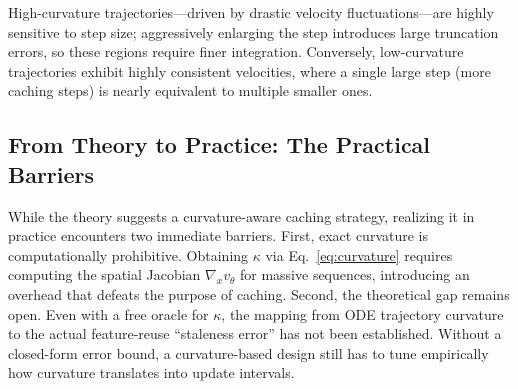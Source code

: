 High-curvature trajectories---driven by drastic velocity fluctuations---are highly sensitive to step size; aggressively enlarging the step introduces large truncation errors, so these regions require finer integration. Conversely, low-curvature trajectories exhibit highly consistent velocities, where a single large step (more caching steps) is nearly equivalent to multiple smaller ones.

\subsection{From Theory to Practice: The Practical Barriers}
While the theory suggests a curvature-aware caching strategy, realizing it in practice encounters two immediate barriers. First, exact curvature is computationally prohibitive. Obtaining $\kappa$ via Eq.~\ref{eq:curvature} requires computing the spatial Jacobian $\nabla_x v_\theta$ for massive sequences, introducing an overhead that defeats the purpose of caching. Second, the theoretical gap remains open. Even with a free oracle for $\kappa$, the mapping from ODE trajectory curvature to the actual feature-reuse ``staleness error'' has not been established. Without a closed-form error bound, a curvature-based design still has to tune empirically how curvature translates into update intervals.